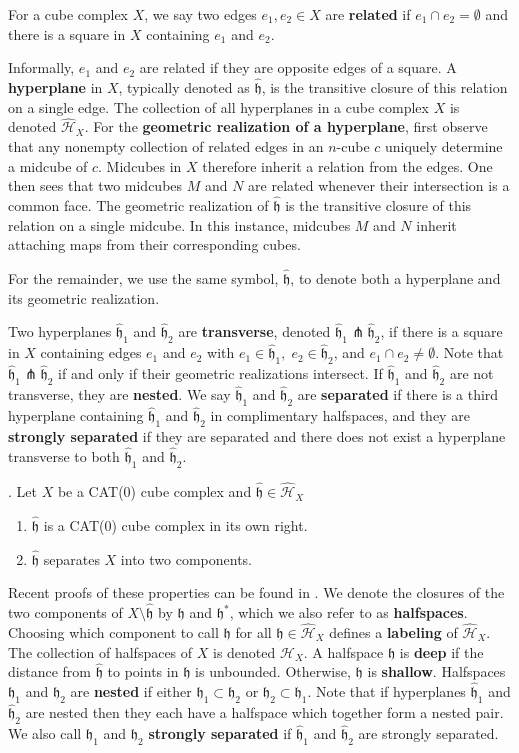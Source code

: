 \documentclass{amsart}
\theoremstyle{definition}
\newtheorem*{Notation warning}{Warning on notations}
\newtheorem*{Sketch of proof}{Sketch of proof for Theorem C}
\newcommand{\h}{{\mathfrak h}}
\newcommand{\hh}{\hat{\mathfrak h}}
\begin{document}
\begin{sloppypar}
For a cube complex $X$, we say two edges $e_1,e_2\in X$ are {\bf related} if $e_1\cap e_2=\emptyset$ and there is a square in $X$ containing $e_1$ and $e_2$.

Informally, $e_1$ and $e_2$ are related if they are opposite edges of a square. A {\bf hyperplane} in $X$, typically denoted as $\hh$, is the transitive closure of this relation on a single edge. The collection of all hyperplanes in a cube complex $X$ is denoted $\hat{\mathcal{H}}_X$. For the {\bf geometric realization of a hyperplane}, first observe that any nonempty collection of related edges in an $n$-cube $c$ uniquely determine a midcube of $c$. Midcubes in $X$ therefore inherit a relation from the edges. One then sees that two midcubes $M$ and $N$ are related whenever their intersection is a common face. The geometric realization of $\hh$ is the transitive closure of this relation on a single midcube. In this instance, midcubes $M$ and $N$ inherit attaching maps from their corresponding cubes.
\medskip

For the remainder, we use the same symbol, $\hh$, to denote both a hyperplane and its geometric realization.
\medskip

Two hyperplanes $\hh_1$ and $\hh_2$ are {\bf transverse}, denoted $\hh_1\pitchfork\hh_2$, if there is a square in $X$ containing edges $e_1$ and $e_2$ with $e_1\in\hh_1,\;e_2\in\hh_2$, and $e_1\cap e_2\neq\emptyset$. Note that $\hh_1\pitchfork\hh_2$ if and only if their geometric realizations intersect. If $\hh_1$ and $\hh_2$ are not transverse, they are {\bf nested}. We say $\hh_1$ and $\hh_2$ are {\bf separated} if there is a third hyperplane containing $\hh_1$ and $\hh_2$ in complimentary halfspaces, and they are {\bf strongly separated} if they are separated and there does not exist a hyperplane transverse to both $\hh_1$ and $\hh_2$.
\medskip

. Let $X$ be a CAT(0) cube complex and $\hh\in\hat{\mathcal{H}}_X$
\begin{enumerate}
    \item $\hh$ is a CAT(0) cube complex in its own right.
 \item $\hh$ separates $X$ into two components.    
\end{enumerate}
\medskip

\noindent Recent proofs of these properties can be found in \cite{10.1007/978-3-319-43674-6_4}.
We denote the closures of the two components of $X\setminus\hh$ by $\h$ and $\h^*$, which we also refer to as {\bf halfspaces}.
Choosing which component to call $\h$ for all $\hh\in\hat{\mathcal{H}}_X$ defines a {\bf labeling} of $\hat{\mathcal{H}}_X$. The collection of halfspaces of $X$ is denoted $\mathcal{H}_X$. A halfspace $\h$ is {\bf deep} if the distance from $\hh$ to points in $\h$ is unbounded. Otherwise, $\h$ is {\bf shallow}. Halfspaces $\h_1$ and $\h_2$ are {\bf nested} if either $\h_1\subset\h_2$ or $\h_2\subset\h_1$. Note that if hyperplanes $\hh_1$ and $\hh_2$ are nested then they each have a halfspace which together form a nested pair. We also call $\h_1$ and $\h_2$ {\bf strongly separated} if $\hh_1$ and $\hh_2$ are strongly separated.


\end{sloppypar}
\end{document}
